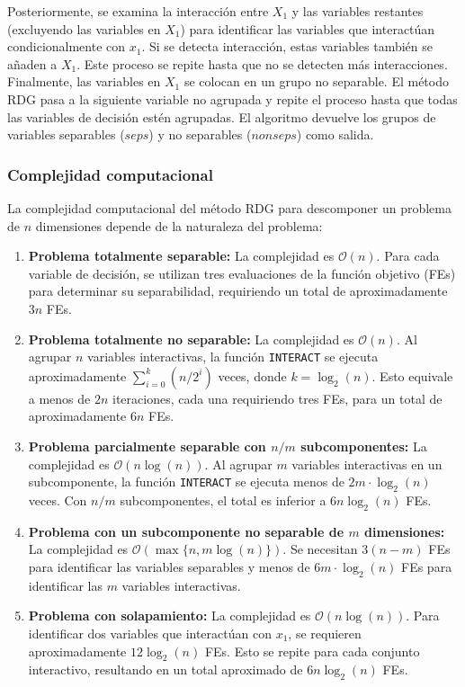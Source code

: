 Posteriormente, se examina la interacción entre \(X_1\) y las variables restantes (excluyendo las variables en \(X_1\)) para identificar las variables que interactúan condicionalmente con \(x_1\). Si se detecta interacción, estas variables también se añaden a \(X_1\). Este proceso se repite hasta que no se detecten más interacciones. Finalmente, las variables en \(X_1\) se colocan en un grupo no separable. El método RDG pasa a la siguiente variable no agrupada y repite el proceso hasta que todas las variables de decisión estén agrupadas. El algoritmo devuelve los grupos de variables separables (\(seps\)) y no separables (\(nonseps\)) como salida.

\subsubsection{Complejidad computacional} 
La complejidad computacional del método RDG para descomponer un problema de \(n\) dimensiones depende de la naturaleza del problema:

\begin{enumerate}
\item \textbf{Problema totalmente separable:} La complejidad es \(\mathcal{O}(n)\). Para cada variable de decisión, se utilizan tres evaluaciones de la función objetivo (FEs) para determinar su separabilidad, requiriendo un total de aproximadamente \(3n\) FEs.
\item \textbf{Problema totalmente no separable:} La complejidad es \(\mathcal{O}(n)\). Al agrupar \(n\) variables interactivas, la función \texttt{INTERACT} se ejecuta aproximadamente \(\sum_{i=0}^{k}(n/2^i)\) veces, donde \(k = \log_2(n)\). Esto equivale a menos de \(2n\) iteraciones, cada una requiriendo tres FEs, para un total de aproximadamente \(6n\) FEs.
\item \textbf{Problema parcialmente separable con \(n/m\) subcomponentes:} La complejidad es \(\mathcal{O}(n \log(n))\). Al agrupar \(m\) variables interactivas en un subcomponente, la función \texttt{INTERACT} se ejecuta menos de \(2m \cdot \log_2(n)\) veces. Con \(n/m\) subcomponentes, el total es inferior a \(6n \log_2(n)\) FEs.
\item \textbf{Problema con un subcomponente no separable de \(m\) dimensiones:} La complejidad es \(\mathcal{O}(\max\{n, m \log(n)\})\). Se necesitan \(3(n-m)\) FEs para identificar las variables separables y menos de \(6m \cdot \log_2(n)\) FEs para identificar las \(m\) variables interactivas.
\item \textbf{Problema con solapamiento:} La complejidad es \(\mathcal{O}(n \log(n))\). Para identificar dos variables que interactúan con \(x_1\), se requieren aproximadamente \(12 \log_2(n)\) FEs. Esto se repite para cada conjunto interactivo, resultando en un total aproximado de \(6n \log_2(n)\) FEs.
\end{enumerate}

